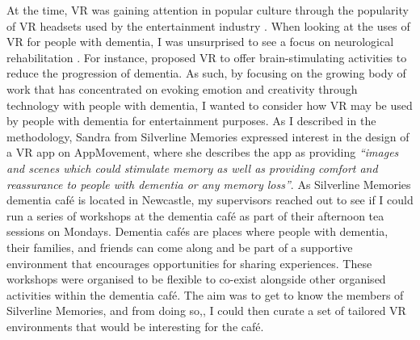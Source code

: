 At the time, VR was gaining attention in popular culture through the popularity of VR headsets used by the entertainment industry \citep{cipriani_understanding_2014}. When looking at the uses of VR for people with dementia, I was unsurprised to see a focus on neurological rehabilitation \citep{schultheis_application_2001,mendez2015virtual}. For instance, \cite{garcia2012discussion} proposed VR to offer brain-stimulating activities to reduce the progression of dementia. As such, by focusing on the growing body of work that has concentrated on evoking emotion \citep{wallace_design-led_2013} and creativity through technology with people with dementia, I wanted to consider how VR may be used by people with dementia for entertainment purposes. As I described in the methodology, Sandra from Silverline Memories expressed interest in the design of a VR app on AppMovement, where she describes the app as providing \textit{``images and scenes which could stimulate memory as well as providing comfort and reassurance to people with dementia or any memory loss''}. As Silverline Memories dementia café is located in Newcastle, my supervisors reached out to see if I could run a series of workshops at the dementia café as part of their afternoon tea sessions on Mondays. Dementia cafés are places where people with dementia, their families, and friends can come along and be part of a supportive environment that encourages opportunities for sharing experiences. These workshops were organised to be flexible to co-exist alongside other organised activities within the dementia café. The aim was to get to know the members of Silverline Memories, and from doing so,, I could then curate a set of tailored VR environments that would be interesting for the café.

